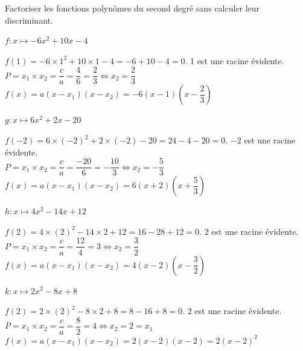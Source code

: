 \documentclass[11pt,a4paper]{article}  %
\begin{document}
	\graphicspath{{../images/}}
	
	\begin{center}
		
		
	\end{center}

Factoriser les fonctions polynômes du second degré sans calculer leur discriminant.
\begin{enumMet}
	\item $f: x \mapsto-6 x^2+10 x-4$
	\begin{corrBox}
		$f(1)=-6\times1^2+10\times1-4=-6+10-4=0$. 1 est une racine évidente.\\
		$P=x_1\times x_2=\dfrac{c}{a}=\dfrac{4}{6}=\dfrac{2}{3}\iff x_2=\dfrac{2}{3}$\\
		$f(x)=a(x-x_1)(x-x_2)=-6(x-1)(x-\dfrac{2}{3})$
	\end{corrBox}
	\item $g: x \mapsto 6 x^2+2 x-20$
	\begin{corrBox}
		$f(-2)=6\times(-2)^2+2\times(-2)-20=24-4-20=0$. $-2$ est une racine évidente.\\
		$P=x_1\times x_2=\dfrac{c}{a}=\dfrac{-20}{6}=-\dfrac{10}{3}\iff x_2=-\dfrac{5}{3}$\\
		$f(x)=a(x-x_1)(x-x_2)=6(x+2)(x+\dfrac{5}{3})$
	\end{corrBox}
	\item $h: x \mapsto 4 x^2-14 x+12$
	\begin{corrBox}
		$f(2)=4\times(2)^2-14\times2+12=16-28+12=0$. $2$ est une racine évidente.\\
		$P=x_1\times x_2=\dfrac{c}{a}=\dfrac{12}{4}=3\iff x_2=\dfrac{3}{2}$\\
		$f(x)=a(x-x_1)(x-x_2)=4(x-2)(x-\dfrac{3}{2})$
	\end{corrBox}
	\item $k: x \mapsto 2 x^2-8 x+8$
	\begin{corrBox}
		$f(2)=2\times(2)^2-8\times2+8=8-16+8=0$. $2$ est une racine évidente.\\
		$P=x_1\times x_2=\dfrac{c}{a}=\dfrac{8}{2}=4\iff x_2=2=x_1$\\
		$f(x)=a(x-x_1)(x-x_2)=2(x-2)(x-2)=2(x-2)^2$
	\end{corrBox}
\end{enumMet}
\end{document}
